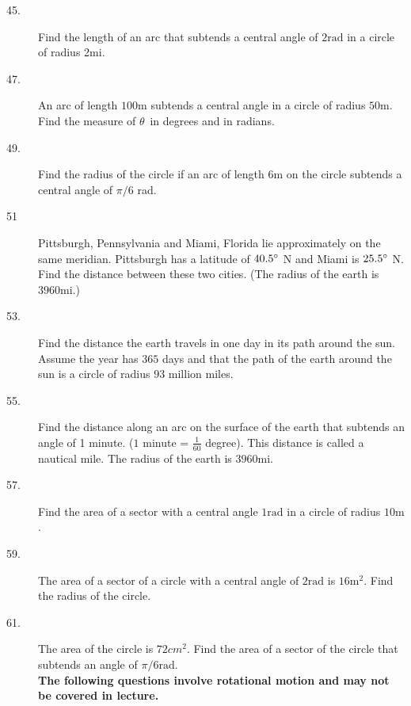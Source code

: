 \begin{description}
\item [45.]
Find the length of an arc that subtends a central angle of $2 \mbox{rad}$ in a circle of radius 2mi. 

\item [47.]
An arc of length $100 \mbox{m}$ subtends a central angle in
a circle of radius $50 \mbox{m}$. Find the measure of $\theta $\ in degrees and in radians. 

\item [49.]
Find the radius of the circle if an arc of length $6 \mbox{m}$ on the circle subtends a central angle of $\pi /6$ rad. 

\item [51] Pittsburgh, Pennsylvania
and Miami, Florida lie approximately on the same meridian. Pittsburgh has a latitude of $40.5 \mbox{{\ensuremath{{}^\circ}}}$ N and Miami is $25.5 \mbox{{\ensuremath{{}^\circ}}}$ N. Find the distance between these two cities. (The
radius of the earth is $3960 \mbox{mi}\text{.}$) 

\item [53.] Find the distance
the earth travels in one day in its path around the sun. Assume the year has $365$ days and that the path of the earth around the sun is a circle of radius $93$ million miles. 

\item [55.] Find
the distance along an arc on the surface of the earth that subtends an angle of 1 minute. ($1$ minute = $\frac{1}{60}$ degree). This distance is called a nautical mile. The
radius of the earth is $3960 \mbox{mi}\text{.}$ 

\item [57.] Find the area
of a sector with a central angle $1 \mbox{rad}$ in a circle of radius $10 \mbox{m}$. 

\item [59.]
The area of a sector of a circle with a central angle of $2 \mbox{rad}$ is $16 \mathrm{m}^{2}$. Find the radius of the circle. 

\item [61.]
The area of the circle is $72 cm^{2}$. Find the area of a sector of the circle that subtends an angle of $\pi /6 \mbox{rad}\text{.}$ \\
\clearpage
\textbf{The following questions involve rotational motion and may not be covered in lecture.}

\columnsep =30pt
\end{description}
